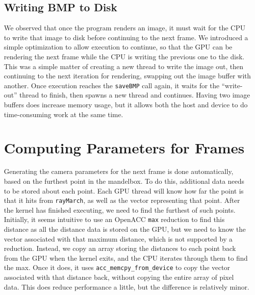 \documentclass[11pt]{article}
\begin{document}
\subsection{Writing BMP to Disk}
We observed that once the program renders an image, it must wait for the CPU to write that image to disk before continuing to the next frame. We introduced a simple optimization to allow execution to continue, so that the GPU can be rendering the next frame while the CPU is writing the previous one to the disk. This was a simple matter of creating a new thread to write the image out, then continuing to the next iteration for rendering, swapping out the image buffer with another. Once execution reaches the \texttt{saveBMP} call again, it waits for the ``write-out'' thread to finish, then spawns a new thread and continues. Having two image buffers does increase memory usage, but it allows both the host and device to do time-consuming work at the same time.

\section{Computing Parameters for Frames}\label{Sec_AutomaticNav}
Generating the camera parameters for the next frame is done automatically, based on the furthest point in the mandelbox. To do this, additional data needs to be stored about each point. Each GPU thread will know how far the point is that it hits from \texttt{rayMarch}, as well as the vector representing that point. After the kernel has finished executing, we need to find the furthest of such points. Initially, it seems intuitive to use an OpenACC \texttt{max} reduction to find this distance as all the distance data is stored on the GPU, but we need to know the vector associated with that maximum distance, which is not supported by a reduction. Instead, we copy an array storing the distances to each point back from the GPU when the kernel exits, and the CPU iterates through them to find the max. Once it does, it uses \texttt{acc\_memcpy\_from\_device} to copy the vector associated with that distance back, without copying the entire array of pixel data. This does reduce performance a little, but the difference is relatively minor.\\
\end{document}
